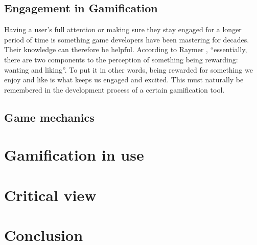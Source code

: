 \documentclass[10pt,twoside,english,a4paper]{article}
\begin{document}
\subsection{Engagement in Gamification} \label{section3.1}
	Having a user’s full attention or making sure they stay engaged for a longer period of time is something game developers have been mastering for decades. 
	Their knowledge can therefore be helpful. 
	According to Raymer \cite{Raymer}, “essentially, there are two components to the perception of something being rewarding: wanting and liking”. 
	To put it in other words, being rewarded for something we enjoy and like is what keeps us engaged and excited. This must naturally be remembered in the development process of a certain gamification tool.\cite{Raymer}

\subsection{Game mechanics} \label{section3.2}



\section{Gamification in use} \label{section4}



\section{Critical view} \label{section5}



\section{Conclusion} \label{section6}





\end{document}
